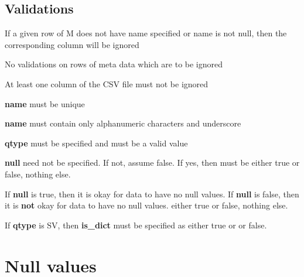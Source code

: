 \documentclass[letterpaper]{article}
\begin{document}
\subsection{Validations}

\begin{invariant}
If a given row of M does not have name specified or name is not null, then the
corresponding column will be ignored
\end{invariant}

\begin{invariant}
No validations on rows of meta data which are to be ignored
\end{invariant}

\begin{invariant}
  At least one column of the CSV file must not be ignored
\end{invariant}

\begin{invariant}
  {\bf name} must be unique
\end{invariant}

\begin{invariant}
  {\bf name} must contain only alphanumeric characters and underscore
\end{invariant}

\begin{invariant}
  {\bf qtype} must be specified and must be a valid value
\end{invariant}

\begin{invariant}
{\bf null} need not be specified. If not, assume false. If yes, then must
be either true or false, nothing else.
\end{invariant}

\begin{invariant}
If {\bf null} is true, then it is okay for data to have no null values.
If {\bf null} is false, then it is {\bf not} okay for data to have no null values.
either true or false, nothing else.
\end{invariant}

\begin{invariant}
If {\bf qtype} is SV, then {\bf is\_dict} must be specified as 
either true or or false. 
\end{invariant}



\section{Null values}
\label{null_values}
\end{document}
